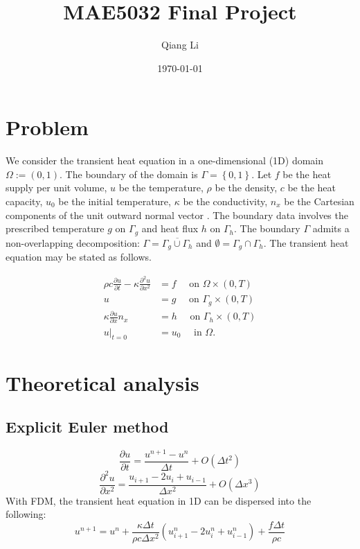 \documentclass[12pt]{article}
\begin{document}
\title{\bf MAE5032 Final Project}
\author{Qiang Li}
\date{\today}
\maketitle

\section*{Problem}
We consider the transient heat equation in a one-dimensional (1D) domain $\Omega := (0,1)$. The boundary of the domain is $\Gamma = \left\lbrace 0, 1 \right\rbrace$.
Let $f$ be the heat supply per unit volume, $u$ be the temperature,  $\rho$ be the density, $c$ be the heat capacity, $u_0$ be the initial temperature, $\kappa$ be the conductivity, $n_x$ be the Cartesian components of the unit outward normal vector . The boundary data involves the prescribed temperature $g$ on $\Gamma_g$ and heat flux $h$ on $\Gamma_h$. The boundary $\Gamma$ admits a non-overlapping decomposition: $\Gamma = \overline{\Gamma_{g} \cup \Gamma_h}$ and $\emptyset = \Gamma_g \cap \Gamma_h$. The transient heat equation may be stated as follows.

\begin{align*}
\rho c \frac{\partial u}{\partial t} - \kappa  \frac{\partial^2 u}{\partial x^2} &= f \quad \mbox{ on } \Omega \times (0,T) \\
u &= g \quad \mbox{ on } \Gamma_{g} \times (0,T) \\
\kappa \frac{\partial u}{\partial x} n_{x}  &= h \quad \mbox{ on } \Gamma_h \times (0,T) \\
u|_{t=0} &= u_0 \quad \mbox{ in } \Omega.
\end{align*}

\section*{Theoretical analysis}
\subsection*{Explicit Euler method}
\begin{equation}
    \frac{\partial u}{\partial t}=\frac{u^{n+1}-u^n}{\Delta t}+O(\Delta t^2)\label{partial time}
\end{equation}
\begin{equation}
    \frac{\partial^2 u}{\partial x^2}=\frac{u_{i+1}-2u_i+u_{i-1}}{\Delta x^2}+O(\Delta x^3)\label{partial u}
\end{equation}
With FDM, the transient heat equation in 1D can be dispersed into the following:
\begin{equation}
    u^{n+1}=u^n+\frac{\kappa\Delta t}{\rho c\Delta x^2}(u_{i+1}^n-2u_i^n+u_{i-1}^n)+\frac{f\Delta t}{\rho c}
\end{equation}
\end{document}
